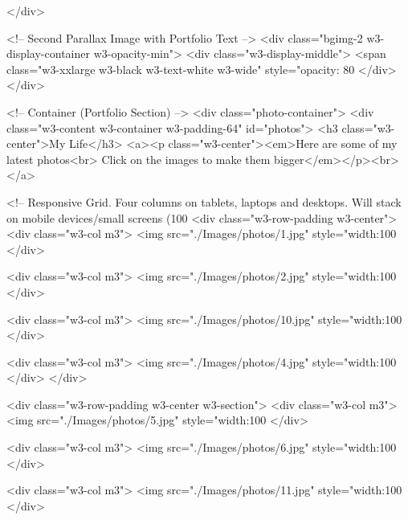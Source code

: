         
    </div>

    <!-- Second Parallax Image with Portfolio Text -->
    <div class="bgimg-2 w3-display-container w3-opacity-min">
        <div class="w3-display-middle">
            <span class="w3-xxlarge w3-black w3-text-white w3-wide" style="opacity: 80%
        </div>
    </div>

    <!-- Container (Portfolio Section) -->
    <div class="photo-container">
        <div class="w3-content w3-container w3-padding-64" id="photos">
            <h3 class="w3-center">My Life</h3>
            <a><p class="w3-center"><em>Here are some of my latest photos<br> Click on the images to make them bigger</em></p><br></a>
    
            <!-- Responsive Grid. Four columns on tablets, laptops and desktops. Will stack on mobile devices/small screens (100%
            <div class="w3-row-padding w3-center">
                <div class="w3-col m3">
                    <img src="./Images/photos/1.jpg" style="width:100%
                </div>
    
                <div class="w3-col m3">
                    <img src="./Images/photos/2.jpg" style="width:100%
                </div>
    
                <div class="w3-col m3">
                    <img src="./Images/photos/10.jpg" style="width:100%
                </div>
    
                <div class="w3-col m3">
                    <img src="./Images/photos/4.jpg" style="width:100%
                </div>
            </div>
    
            <div class="w3-row-padding w3-center w3-section">
                <div class="w3-col m3">
                    <img src="./Images/photos/5.jpg" style="width:100%
                </div>
    
                <div class="w3-col m3">
                    <img src="./Images/photos/6.jpg" style="width:100%
                </div>
    
                <div class="w3-col m3">
                    <img src="./Images/photos/11.jpg" style="width:100%
                </div>
    
